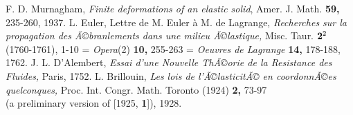 \documentclass[12pt]{article}
\begin{document}
\begin{thebibliography}{1}
F. D. Murnagham, {\em Finite deformations of an elastic solid}, Amer. J. Math. {\bf 59,} 235-260, 1937.
L. Euler, Lettre de M. Euler \`{a} M. de Lagrange, {\em Recherches sur la propagation des Ã©branlements dans une milieu Ã©lastique,} Misc. Taur. ${\bf 2}^2$ (1760-1761), 1-10 = {\em Opera}(2) {\bf 10,} 255-263 = {\em Oeuvres de Lagrange} {\bf 14,} 178-188, 1762.
J. L. D'Alembert, {\em Essai d'une Nouvelle ThÃ©orie de la Resistance des Fluides,} Paris, 1752.
L. Brillouin, {\em Les lois de l'Ã©lasticitÃ© en coordonnÃ©es quelconques,} Proc. Int. Congr. Math. Toronto (1924) {\bf 2,} 73-97 \\(a preliminary version of [1925, {\bf 1}]), 1928.   
\end{thebibliography}
\end{document}
